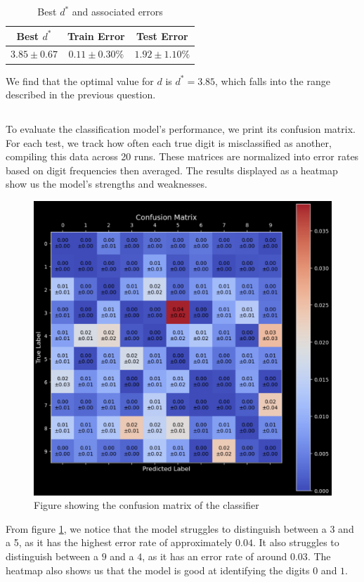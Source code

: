 \documentclass[final,3p,times,12pt]{article}
\begin{document}
\begin{table}[H]
\centering
\caption{Best $d^*$ and associated errors}
\begin{tabular}{ccc}
\toprule
Best $d^*$ & Train Error & Test Error \\
\midrule
$3.85 \pm 0.67$ & $0.11 \pm 0.30\%$ & $1.92 \pm 1.10\%$ \\
\bottomrule
\end{tabular}
\end{table}

We find that the optimal value for $d$ is $d^*=3.85$, which falls into the range described in the previous question. 

\subsection{}
To evaluate the classification model's performance, we print its confusion matrix. For each test, we track how often each true digit is misclassified as another, compiling this data across 20 runs. These matrices are normalized into error rates based on digit frequencies then averaged. The results displayed as a heatmap show us the model's strengths and weaknesses. 
\begin{figure}[H]
    \centering
    \includegraphics[width=0.8\linewidth]{images/confusion_matrix.png}
    \caption{Figure showing the confusion matrix of the classifier}
    \label{fig:confusion_matrix}
\end{figure}

From figure \ref{fig:confusion_matrix}, we notice that the model struggles to distinguish between a 3 and a 5, as it has the highest error rate of approximately $0.04$. It also struggles to distinguish between a $9$ and a $4$, as it has an error rate of around $0.03$. The heatmap also shows us that the model is good at identifying the digits $0$ and $1$. 
\end{document}

